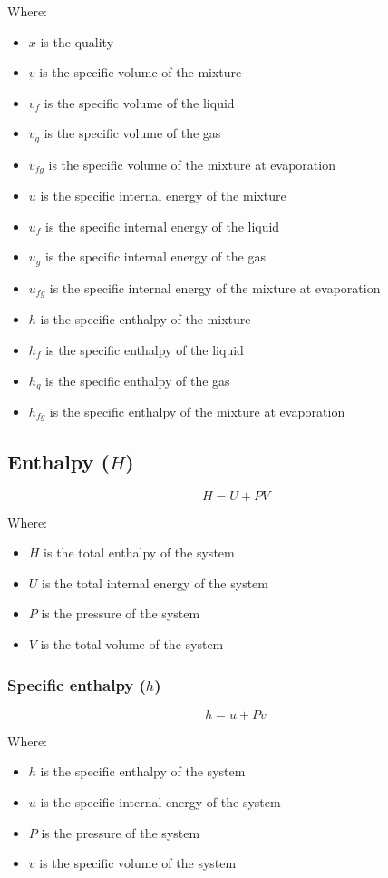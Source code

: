 \documentclass[11pt]{article}
\begin{document}
Where:
\begin{itemize}
\item \(x\) is the quality
\item \(v\) is the specific volume of the mixture
\item \(v_f\) is the specific volume of the liquid
\item \(v_g\) is the specific volume of the gas
\item \(v_{fg}\) is the specific volume of the mixture at evaporation
\item \(u\) is the specific internal energy of the mixture
\item \(u_f\) is the specific internal energy of the liquid
\item \(u_g\) is the specific internal energy of the gas
\item \(u_{fg}\) is the specific internal energy of the mixture at evaporation
\item \(h\) is the specific enthalpy of the mixture
\item \(h_f\) is the specific enthalpy of the liquid
\item \(h_g\) is the specific enthalpy of the gas
\item \(h_{fg}\) is the specific enthalpy of the mixture at evaporation
\end{itemize}

\newpage
\subsection{Enthalpy (\(H\))}
\label{sec:org00920ff}
\[H = U + PV\]

Where:
\begin{itemize}
\item \(H\) is the total enthalpy of the system
\item \(U\) is the total internal energy of the system
\item \(P\) is the pressure of the system
\item \(V\) is the total volume of the system
\end{itemize}
\subsubsection{Specific enthalpy (\(h\))}
\label{sec:org58300cb}
\[h = u + Pv\]

Where:
\begin{itemize}
\item \(h\) is the specific enthalpy of the system
\item \(u\) is the specific internal energy of the system
\item \(P\) is the pressure of the system
\item \(v\) is the specific volume of the system
\end{itemize}
\end{document}
